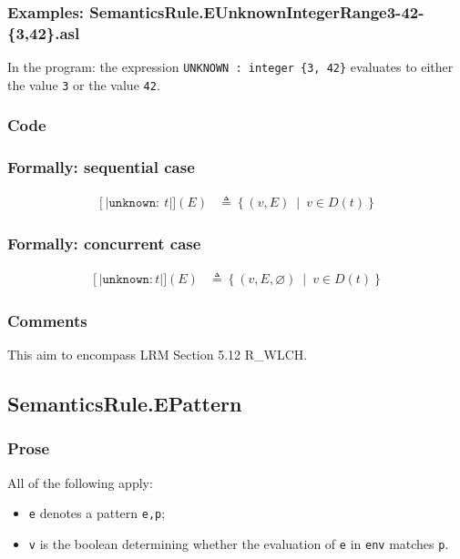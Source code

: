 \documentclass{book}
\newcommand\syntt[1]{\mathtt{#1}}
\newcommand\llbracket{[|}
\newcommand\rrbracket{|]}
\newcommand\interp[1]{\left\llbracket #1 \right\rrbracket}
\newcommand\st[0]{\ \middle|\ }
\begin{document}
  \subsubsection{Examples: SemanticsRule.EUnknownIntegerRange3-42-\{3,42\}.asl}

    In the program:
    the expression \texttt{UNKNOWN : integer \{3, 42\}} evaluates to either the value
\texttt{3} or the value \texttt{42}.

  \subsubsection{Code}

  \subsubsection{Formally: sequential case}

  \begin{align}  
  \interp{\syntt{unknown:}\ t} (E) & \triangleq \left\{ (v, E) \st{} v \in{} D(t) \right\}
  \label{eq:sem-det-unknown}  
  \end{align}  

  \subsubsection{Formally: concurrent case}

  \begin{align}
  \interp{\syntt{unknown:} t} (E) & \triangleq \left\{ (v, E, \varnothing) \st{} v \in{} D(t) \right\}
  \label{eq:sem-ndet-unknown}
  \end{align}

  \subsubsection{Comments}
  This aim to encompass LRM Section 5.12 R\_WLCH.

\subsection{SemanticsRule.EPattern \label{sec:SemanticsRule.EPattern}}

  \subsubsection{Prose}
  All of the following apply:
  \begin{itemize}
  \item \texttt{e} denotes a pattern \texttt{e,p};
  \item \texttt{v} is the boolean determining whether the evaluation of \texttt{e} in \texttt{env} matches \texttt{p}.
  \end{itemize}
\end{document}
